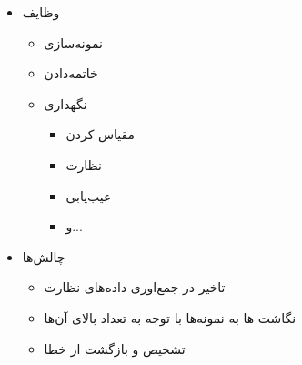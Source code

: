 \documentclass{beamer}
\makeatletter
\newcommand{\RTList}{\raggedleft\rightskip\@totalleftmargin}
\makeatother
\begin{document}
\begin{persian}
\begin{frame}{}
    \begin{itemize}\RTList{}
        \justifying
        \item وظایف
        \begin{itemize}\RTList{}
            \item نمونه‌سازی
            \item خاتمه‌دادن
            \item نگهداری
            \begin{itemize}\RTList{}
                \item مقیاس کردن
                \item نظارت
                \item عیب‌یابی
                \item و...
            \end{itemize}
        \end{itemize}
        \item چالش‌ها
        \begin{itemize}\RTList{}
            \item تاخیر در جمع‌اوری داده‌های نظارت
            \item نگاشت ها به نمونه‌ها با توجه به تعداد بالای آن‌ها
            \item تشخیص و بازگشت از خطا
        \end{itemize}
    \end{itemize}
\end{frame}
\begin{frame}{}

\end{frame}
\end{persian}
\end{document}
